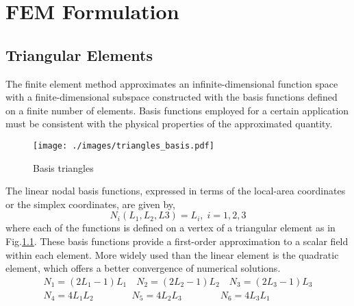 \documentclass[hidelinks,12pt,twoside]{iiscthes}
\begin{document}
 

\chapter{FEM Formulation}
\section{Triangular Elements}
The finite element method approximates an infinite-dimensional function space with a finite-dimensional subspace constructed with the basis functions defined on a finite number of elements. Basis functions employed for a certain application must be consistent with the physical properties of the approximated quantity. 

\begin{figure}[h]
	\texttt{[image: ./images/triangles\_basis.pdf]}
	\caption{Basis triangles}
	\label{fig:tri_base}
\end{figure}
The linear nodal basis functions, expressed in terms of the local-area coordinates or the simplex coordinates, are given by,
\begin{equation}
	N_i(L_1, L_2, L3) = L_i, \;i = 1,2,3
\end{equation}
where each of the functions is defined on a vertex of a triangular element as in Fig.\ref{fig:tri_base}.
These basis functions provide a first-order approximation to a scalar field within each element. More widely used than the linear element is the quadratic element, which offers a better convergence of numerical solutions.
\begin{equation}
\begin{split}
	N_1 = (2L_1 -1)L_1 \quad
	N_2 = (2L_2 -1)L_2\quad
	N_3 = (2L_3 -1)L_3\\
	N_4 = 4L_1 L_2\quad\quad\quad\quad
	N_5 = 4L_2 L_3\quad\quad\quad\quad
	N_6 = 4L_3L_1
\end{split}
\end{equation}




\end{document}
